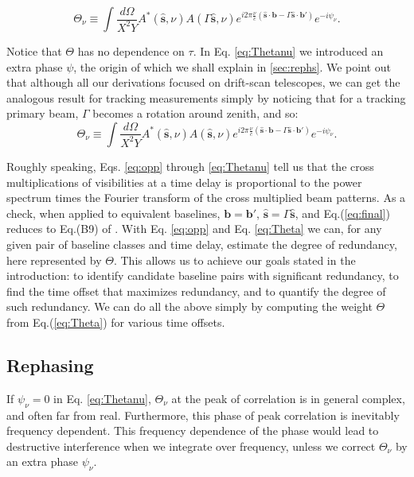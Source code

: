 \documentclass[twocolumn,apj,numberedappendix]{emulateapj}
\renewcommand\[{\begin{equation}}
\renewcommand\]{\end{equation}}
\begin{document}
\[
\Theta_{\nu} \equiv \int \frac{d\Omega}{X^{2}Y}A^{*}(\hat{\boldsymbol{s}},\nu)A(\Gamma\hat{\boldsymbol{s}},\nu) e^{i2\pi\frac{\nu}{c}\left(\hat{\boldsymbol{s}}\cdot\boldsymbol{b}-\Gamma\hat{\boldsymbol{s}}\cdot\boldsymbol{b'}\right)}e^{-i\psi_{\nu}}.
\label{eq:Thetanu}
\]


Notice that $\Theta$ has no dependence on $\tau$. In Eq. \eqref{eq:Thetanu} we introduced an extra phase $\psi$, the origin of which we shall explain in \ref{sec:rephs}. We point out that although all our derivations focused on drift-scan telescopes, we can get the analogous result for tracking measurements simply by noticing that for a tracking primary beam, $\Gamma$ becomes a rotation around zenith, and so:
\[
\Theta_{\nu} \equiv \int \frac{d\Omega}{X^{2}Y}A^{*}(\hat{\boldsymbol{s}},\nu)A(\hat{\boldsymbol{s}},\nu) e^{i2\pi\frac{\nu}{c}\left(\hat{\boldsymbol{s}}\cdot\boldsymbol{b}-\Gamma\hat{\boldsymbol{s}}\cdot\boldsymbol{b'}\right)}e^{-i\psi_{\nu}}.
\label{eq:Thetanu_tracking}
\]

Roughly speaking, Eqs. \eqref{eq:opp} through \eqref{eq:Thetanu} tell us that the cross multiplications of visibilities at a time delay is proportional to the power spectrum times the Fourier
transform of the cross multiplied beam patterns. As a check, when applied to equivalent baselines,
$\boldsymbol{b}=\boldsymbol{b'}$, $\hat{\boldsymbol{s}}=\Gamma\hat{\boldsymbol{s}}$, and Eq.(\ref{eq:final}) reduces to Eq.(B9) of \cite{paper32}. 
With Eq. \eqref{eq:opp} and Eq. \eqref{eq:Theta} we can, for any given pair of baseline classes and time delay, estimate the degree of redundancy, here represented by $\Theta$. This allows us to achieve our goals stated in the introduction: to identify 
candidate baseline pairs with significant redundancy, to find the time offset that maximizes redundancy, and to quantify the degree of such redundancy. We can do all the above simply by computing the weight $\Theta$ from
Eq.(\ref{eq:Theta}) for various time offsets. 



\subsection{Rephasing \label{sec:rephs}}
If $\psi_{\nu}=0$ in  Eq. \eqref{eq:Thetanu}, $\Theta_{\nu}$ at the peak of correlation is in general complex, and often far from real. Furthermore, this phase of peak correlation is inevitably frequency dependent. This frequency dependence of the phase would lead to destructive interference when we integrate over frequency, unless we correct $\Theta_{\nu}$ by an extra phase $\psi_\nu$. 
\end{document}
